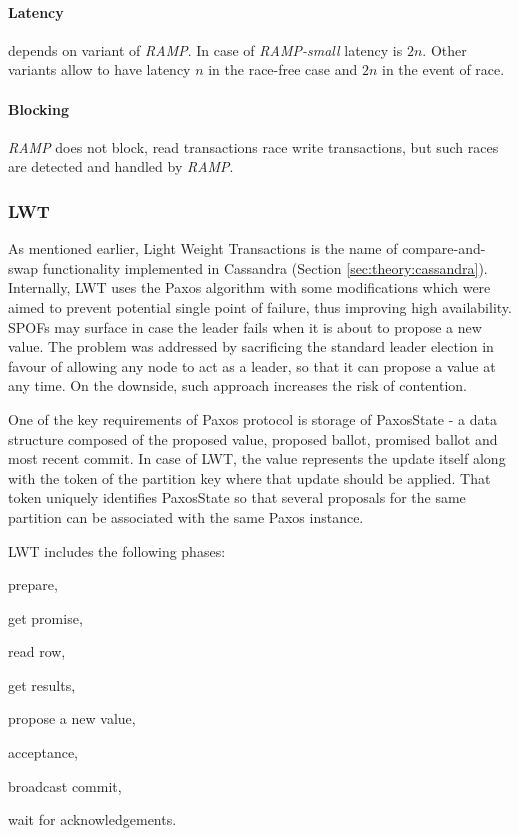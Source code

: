 \paragraph{Latency} depends on variant of \emph{RAMP}. In case of \emph{RAMP-small} latency is $2n$. Other variants allow to have latency $n$ in the race-free case and $2n$ in the event of race.

\paragraph{Blocking} \emph{RAMP} does not block, read transactions race write transactions, but such races are detected and handled by \emph{RAMP}.


\subsubsection{LWT}\label{sec:theory:transactions:lwt}

As mentioned earlier, Light Weight Transactions is the name of compare-and-swap functionality implemented in Cassandra (Section \ref{sec:theory:cassandra}). Internally, LWT uses the Paxos algorithm with some modifications which were aimed to prevent potential single point of failure, thus improving high availability. SPOFs may surface in case the leader fails when it is about to propose a new value. The problem was addressed by sacrificing the standard leader election in favour of allowing any node to act as a leader, so that it can propose a value at any time. On the downside, such approach increases the risk of contention. 

One of the key requirements of Paxos protocol is storage of PaxosState - a data structure composed of the proposed value, proposed ballot, promised ballot and most recent commit. In case of LWT, the value represents the update itself along with the token of the partition key where that update should be applied. That token uniquely identifies PaxosState so that several proposals for the same partition can be associated with the same Paxos instance. 


LWT includes the following phases: \begin{enumerate*}[label=\alph*)]
\item prepare,
\item get promise,
\item read row,
\item get results,
\item propose a new value,
\item acceptance,
\item broadcast commit,
\item wait for acknowledgements.
\end{enumerate*} 

